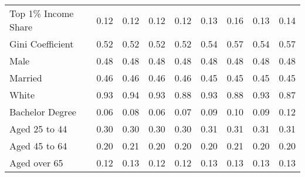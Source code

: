 \documentclass[../Main.tex]{subfiles}
\begin{document}
\begin{table}[htbp]
\begin{tabular}{@{\extracolsep{4pt}}l*{8}{c}}
\multicolumn{1}{l}{Top 1\% Income Share} & \multicolumn{1}{c}{0.12} & \multicolumn{1}{c}{0.12} & \multicolumn{1}{c}{0.12} & \multicolumn{1}{c}{0.12} & \multicolumn{1}{c}{0.13} & \multicolumn{1}{c}{0.16} & \multicolumn{1}{c}{0.13} & \multicolumn{1}{c}{0.14}\\
\multicolumn{1}{l}{Gini Coefficient} & \multicolumn{1}{c}{0.52} & \multicolumn{1}{c}{0.52} & \multicolumn{1}{c}{0.52} & \multicolumn{1}{c}{0.52} & \multicolumn{1}{c}{0.54} & \multicolumn{1}{c}{0.57} & \multicolumn{1}{c}{0.54} & \multicolumn{1}{c}{0.57}\\
\multicolumn{1}{l}{Male} & \multicolumn{1}{c}{0.48} & \multicolumn{1}{c}{0.48} & \multicolumn{1}{c}{0.48} & \multicolumn{1}{c}{0.48} & \multicolumn{1}{c}{0.48} & \multicolumn{1}{c}{0.48} & \multicolumn{1}{c}{0.48} & \multicolumn{1}{c}{0.48}\\
\multicolumn{1}{l}{Married} & \multicolumn{1}{c}{0.46} & \multicolumn{1}{c}{0.46} & \multicolumn{1}{c}{0.46} & \multicolumn{1}{c}{0.46} & \multicolumn{1}{c}{0.45} & \multicolumn{1}{c}{0.45} & \multicolumn{1}{c}{0.45} & \multicolumn{1}{c}{0.45}\\
\multicolumn{1}{l}{White} & \multicolumn{1}{c}{0.93} & \multicolumn{1}{c}{0.94} & \multicolumn{1}{c}{0.93} & \multicolumn{1}{c}{0.88} & \multicolumn{1}{c}{0.93} & \multicolumn{1}{c}{0.88} & \multicolumn{1}{c}{0.93} & \multicolumn{1}{c}{0.87}\\
\multicolumn{1}{l}{Bachelor Degree} & \multicolumn{1}{c}{0.06} & \multicolumn{1}{c}{0.08} & \multicolumn{1}{c}{0.06} & \multicolumn{1}{c}{0.07} & \multicolumn{1}{c}{0.09} & \multicolumn{1}{c}{0.10} & \multicolumn{1}{c}{0.09} & \multicolumn{1}{c}{0.12}\\
\multicolumn{1}{l}{Aged 25 to 44} & \multicolumn{1}{c}{0.30} & \multicolumn{1}{c}{0.30} & \multicolumn{1}{c}{0.30} & \multicolumn{1}{c}{0.30} & \multicolumn{1}{c}{0.31} & \multicolumn{1}{c}{0.31} & \multicolumn{1}{c}{0.31} & \multicolumn{1}{c}{0.31}\\
\multicolumn{1}{l}{Aged 45 to 64} & \multicolumn{1}{c}{0.20} & \multicolumn{1}{c}{0.21} & \multicolumn{1}{c}{0.20} & \multicolumn{1}{c}{0.20} & \multicolumn{1}{c}{0.20} & \multicolumn{1}{c}{0.21} & \multicolumn{1}{c}{0.20} & \multicolumn{1}{c}{0.20}\\
\multicolumn{1}{l}{Aged over 65} & \multicolumn{1}{c}{0.12} & \multicolumn{1}{c}{0.13} & \multicolumn{1}{c}{0.12} & \multicolumn{1}{c}{0.12} & \multicolumn{1}{c}{0.13} & \multicolumn{1}{c}{0.13} & \multicolumn{1}{c}{0.13} & \multicolumn{1}{c}{0.13}\\

\end{tabular}
\end{table}
\end{document}
